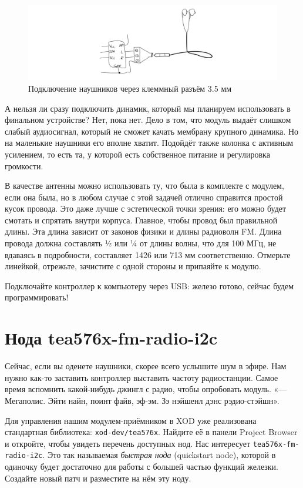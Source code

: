 \begin{figure}
\centering
\includegraphics{sketches/trs-35-mm}
\caption{Подключение наушников через клеммный разъём 3.5 мм}
\end{figure}

А нельзя ли сразу подключить динамик, который мы планируем использовать в финальном устройстве? Нет, пока нет. Дело в том, что модуль выдаёт слишком слабый аудиосигнал, который не сможет качать мембрану крупного динамика. Но на маленькие наушники его вполне хватит. Подойдёт также колонка с активным усилением, то есть та, у которой есть собственное питание и регулировка громкости.

В качестве антенны можно использовать ту, что была в комплекте с модулем, если она была, но в любом случае с этой задачей отлично справится простой кусок провода. Это даже лучше с эстетической точки зрения: его можно будет смотать и спрятать внутри корпуса. Главное, чтобы провод был правильной длины. Эта длина зависит от законов физики и длины радиоволн FM. Длина провода должна составлять ½ или ¼ от длины волны, что для 100 МГц, не вдаваясь в подробности, составляет 1426 или 713 мм соответственно. Отмерьте линейкой, отрежьте, зачистите с одной стороны и припаяйте к модулю.

Подключайте контроллер к компьютеру через USB: железо готово, сейчас будем программировать!

\section{Нода tea576x-fm-radio-i2c}


Сейчас, если вы оденете наушники, скорее всего услышите шум в эфире. Нам нужно как-то заставить контроллер выставить частоту радиостанции. Самое время вспомнить какой-нибудь джингл с радио, чтобы опробовать модуль.  «— Мегаполис. Эйти найн, поинт файв, эф-эм. Зэ нэйшенл дэнс рэдио-стэйшн».

Для управления нашим модулем-приёмником в XOD уже реализована стандартная библиотека: \texttt{xod-dev/tea576x}. Найдите её в панели Project Browser и откройте, чтобы увидеть перечень доступных нод. Нас интересует \texttt{tea576x-fm-radio-i2c}. Это так называемая \emph{быстрая нода} (quickstart node), которой в одиночку будет достаточно для работы с большей частью функций железки. Создайте новый патч и разместите на нём эту ноду.

